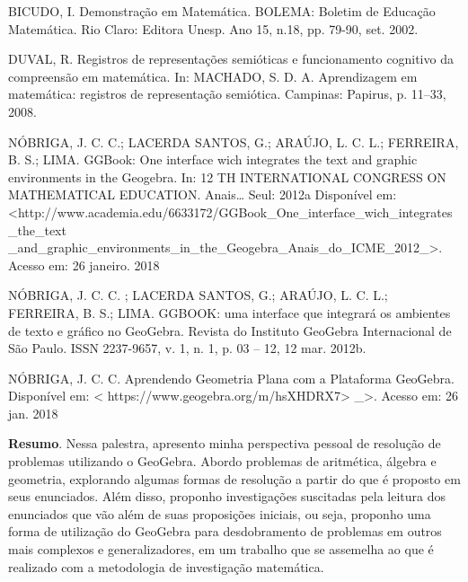 \begin{thebibliography}{999}
	 BICUDO, I. Demonstração em Matemática. BOLEMA: Boletim de Educação Matemática. Rio Claro: Editora Unesp. Ano 15, n.18, pp. 79-90, set. 2002.
	
	 DUVAL, R. Registros de representações semióticas e funcionamento cognitivo da compreensão em matemática. In: MACHADO, S. D. A. Aprendizagem em matemática: registros de representação semiótica. Campinas: Papirus, p. 11–33, 2008. 
	
	 NÓBRIGA, J. C. C.; LACERDA SANTOS, G.; ARAÚJO, L. C. L.; FERREIRA, B. S.; LIMA. GGBook: One interface wich integrates the text and graphic environments in the Geogebra. In: 12 TH INTERNATIONAL CONGRESS ON MATHEMATICAL EDUCATION. Anais… Seul: 2012a Disponível em: <http://www.academia.edu/6633172/GGBook\_One\_interface\_wich\_integrates\_the\_text\\ \_and\_graphic\_environments\_in\_the\_Geogebra\_Anais\_do\_ICME\_2012\_>. Acesso em: 26 janeiro. 2018
	
	 NÓBRIGA, J. C. C. ; LACERDA SANTOS, G.; ARAÚJO, L. C. L.; FERREIRA, B. S.; LIMA. GGBOOK: uma interface que integrará os ambientes de texto e gráfico no GeoGebra. Revista do Instituto GeoGebra Internacional de São Paulo. ISSN 2237-9657, v. 1, n. 1, p. 03 – 12, 12 mar. 2012b. 
	
	 NÓBRIGA, J. C. C. Aprendendo Geometria Plana com a Plataforma GeoGebra.  Disponível em: < https://www.geogebra.org/m/hsXHDRX7> \_>. Acesso em: 26 jan. 2018
\end{thebibliography}

\vspace{24pt}




	\noindent\textbf{Resumo}.\label{scd} 
	Nessa palestra, apresento minha perspectiva pessoal de resolução de problemas utilizando o GeoGebra. Abordo problemas de aritmética, álgebra e geometria, explorando algumas formas de resolução a partir do que é proposto em seus enunciados. Além disso, proponho investigações suscitadas pela leitura dos enunciados que vão além de suas proposições iniciais, ou seja, proponho uma forma de utilização do GeoGebra para desdobramento de problemas em outros mais complexos e generalizadores, em um trabalho que se assemelha ao que é realizado com a metodologia de investigação matemática.
	
